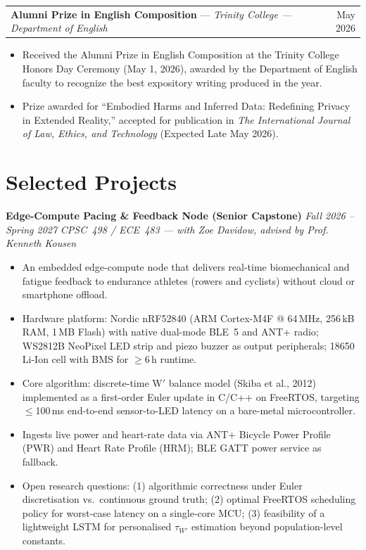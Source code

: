 \documentclass[10pt, letterpaper]{article}
\makeatletter
\newcommand{\cventryshort}[3]{%
  \begin{tabularx}{\linewidth}{@{}X r@{}}
    \textbf{#1} \textnormal{---} \textit{#2} & \textnormal{#3}
  \end{tabularx}\vspace{1pt}}
\newcommand{\cvproject}[2]{\textbf{#1} \hfill \textit{#2}\vspace{1pt}}
\makeatother
\begin{document}
\cventryshort{Alumni Prize in English Composition}{Trinity College --- Department of English}{May 2026}
\begin{itemize}
  \item Received the Alumni Prize in English Composition at the Trinity College Honors Day
        Ceremony (May 1, 2026), awarded by the Department of English faculty to recognize the
        best expository writing produced in the year.
  \item Prize awarded for ``Embodied Harms and Inferred Data: Redefining Privacy in Extended
        Reality,'' accepted for publication in \textit{The International Journal of Law,
        Ethics, and Technology} (Expected Late May 2026).
\end{itemize}

\section{Selected Projects}

\cvproject{Edge-Compute Pacing \& Feedback Node (Senior Capstone)}{Fall 2026 -- Spring 2027}
\textit{CPSC~498 / ECE~483 --- with Zoe Davidow, advised by Prof. Kenneth Kousen}\\[2pt]
\begin{itemize}
  \item An embedded edge-compute node that delivers real-time biomechanical and fatigue
        feedback to endurance athletes (rowers and cyclists) without cloud or smartphone offload.
  \item Hardware platform: Nordic nRF52840 (ARM Cortex-M4F @ 64\,MHz, 256\,kB RAM, 1\,MB Flash)
        with native dual-mode BLE~5 and ANT+ radio; WS2812B NeoPixel LED strip and piezo
        buzzer as output peripherals; 18650 Li-Ion cell with BMS for $\geq$6\,h runtime.
  \item Core algorithm: discrete-time W$'$ balance model (Skiba et al., 2012) implemented as a
        first-order Euler update in C/C++ on FreeRTOS, targeting $\leq$100\,ms end-to-end
        sensor-to-LED latency on a bare-metal microcontroller.
  \item Ingests live power and heart-rate data via ANT+ Bicycle Power Profile (PWR) and Heart
        Rate Profile (HRM); BLE GATT power service as fallback.
  \item Open research questions: (1) algorithmic correctness under Euler discretisation vs.\
        continuous ground truth; (2) optimal FreeRTOS scheduling policy for worst-case latency
        on a single-core MCU; (3) feasibility of a lightweight LSTM for personalised
        $\tau_{W'}$ estimation beyond population-level constants.
\end{itemize}
\end{document}
